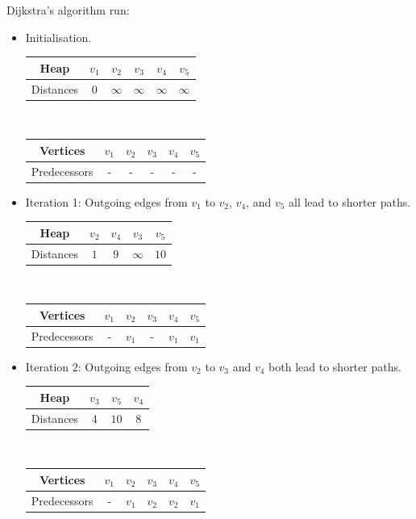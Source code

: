 \begin{table}[h]
	\begin{minipage}[t]{0.45 \textwidth}
	Dijkstra's algorithm \cite[p. 17]{FUH_algo_graphs_2021} run:
	\begin{itemize}
	\item Initialisation.
	
	\begin{tabular}{|c|ccccc|}
			\hline
			     Heap & $v_1$ & $v_2$ & $v_3$ & $v_4$ & $v_5$ \tabularnewline
			\hline
			Distances &  $0$  &  $\infty$ &  $\infty$ &     $\infty$ &    $\infty$ \tabularnewline
			\hline
	\end{tabular}\\
	\begin{tabular}{|c|ccccc|}
			\hline
			     Vertices & $v_1$ & $v_2$ & $v_3$ & $v_4$ & $v_5$ \tabularnewline
			\hline
			Predecessors &  -  &  - &  - &     - &    - \tabularnewline
			\hline
	\end{tabular}
	

	\item Iteration 1: Outgoing edges from $v_1$ to $v_2$, $v_4$, and $v_5$
		all lead to shorter paths.
	
	\begin{tabular}{|c|cccc|}
			\hline
			     Heap & $v_2$ & $v_4$ & $v_3$ & $v_5$ \tabularnewline
			\hline
			Distances &  $1$  &  $9$ &  $\infty$ &     $10$  \tabularnewline
			\hline
	\end{tabular}\\
	\begin{tabular}{|c|ccccc|}
			\hline
			     Vertices & $v_1$ & $v_2$ & $v_3$ & $v_4$ & $v_5$ \tabularnewline
			\hline
			Predecessors &  -  &  $v_1$ &  - &     $v_1$ &    $v_1$ \tabularnewline
			\hline
	\end{tabular}


	\item Iteration 2: Outgoing edges from $v_2$ to $v_3$ and $v_4$
		both lead to shorter paths.
	
	\begin{tabular}{|c|ccc|}
			\hline
			     Heap & $v_3$ & $v_5$ & $v_4$  \tabularnewline
			\hline
			Distances &  $4$  &  $10$ &  $8$  \tabularnewline
			\hline
	\end{tabular}\\
	\begin{tabular}{|c|ccccc|}
			\hline
			     Vertices & $v_1$ & $v_2$ & $v_3$ & $v_4$ & $v_5$ \tabularnewline
			\hline
			Predecessors &  -  &  $v_1$ &  $v_2$ &     $v_2$ &    $v_1$ \tabularnewline
			\hline
	\end{tabular}



\end{itemize}
\end{minipage}
\end{table}
